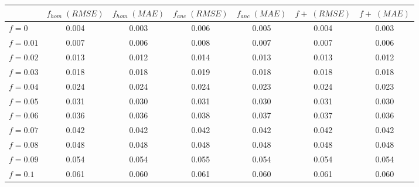 \begin{tabular}{lcccccc}
\toprule
 & $f_{hom}\;(RMSE)$ & $f_{hom}\;(MAE)$ & $f_{anc}\;(RMSE)$ & $f_{anc}\;(MAE)$ & $f+\;(RMSE)$ & $f+\;(MAE)$ \\
\midrule
$f = 0$ & 0.004 & 0.003 & 0.006 & 0.005 & 0.004 & 0.003 \\
$f = 0.01$ & 0.007 & 0.006 & 0.008 & 0.007 & 0.007 & 0.006 \\
$f = 0.02$ & 0.013 & 0.012 & 0.014 & 0.013 & 0.013 & 0.012 \\
$f = 0.03$ & 0.018 & 0.018 & 0.019 & 0.018 & 0.018 & 0.018 \\
$f = 0.04$ & 0.024 & 0.024 & 0.024 & 0.023 & 0.024 & 0.023 \\
$f = 0.05$ & 0.031 & 0.030 & 0.031 & 0.030 & 0.031 & 0.030 \\
$f = 0.06$ & 0.036 & 0.036 & 0.038 & 0.037 & 0.037 & 0.036 \\
$f = 0.07$ & 0.042 & 0.042 & 0.042 & 0.042 & 0.042 & 0.042 \\
$f = 0.08$ & 0.048 & 0.048 & 0.048 & 0.048 & 0.048 & 0.048 \\
$f = 0.09$ & 0.054 & 0.054 & 0.055 & 0.054 & 0.054 & 0.054 \\
$f = 0.1$ & 0.061 & 0.060 & 0.061 & 0.060 & 0.061 & 0.060 \\
\bottomrule
\end{tabular}
